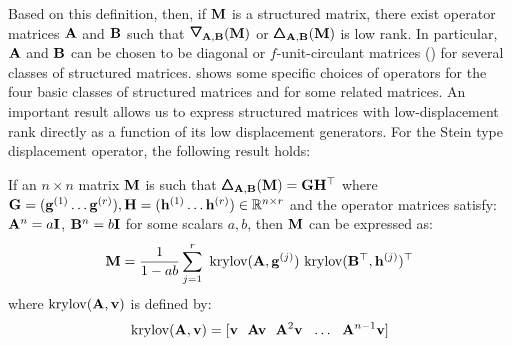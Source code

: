 \noindent
Based on this definition, then, if $\mathbf{M}$ is a structured matrix, there exist operator matrices $\mathbf{A}$ and $\mathbf{B}$ such that $\triangleopdown_{\Amat, \Bmat} (\Mmat)$ or $\pmb{\bigtriangleup}_{\mathbf{A}, \mathbf{B}} (\mathbf{M})$ is low rank.
In particular, $\mathbf{A}$ and $\mathbf{B}$ can be chosen to be diagonal or $f$-unit-circulant matrices (\eg {}) for several classes of structured matrices.
 shows some specific choices of operators for the four basic classes of structured matrices and for some related matrices.
An important result allows us to express structured matrices with low-displacement rank directly as a function of its low displacement generators.  
For the Stein type displacement operator, the following result holds:
\begin{theorem} \label{theorem:ch3-krylov_decomposition}
  If an $n \times n$ matrix $\mathbf{M}$ is such that $\pmb{\bigtriangleup}_{\mathbf{A}, \mathbf{B}}(\mathbf{M}) = \mathbf{G} \mathbf{H}^\top$ where 
  $\mathbf{G} = (\mathbf{g}^{(1)} \ldots \mathbf{g}^{(r)}), \mathbf{H} = (\mathbf{h}^{(1)} \ldots \mathbf{h}^{(r)}) \in \mathbb{R}^{n \times r}$ 
  and the operator matrices satisfy: $\mathbf{A}^n = a \mathbf{I}$, $\mathbf{B}^n = b \mathbf{I}$ for some scalars $a, b$, then $\mathbf{M}$ can be expressed as: 
  \begin{equation} \label{equation:ch3-krylov_decomposition}
    \mathbf{M} = \frac{1}{1 - ab} \sum_{j=1}^{r} ~\mathrm{krylov}(\mathbf{A}, \mathbf{g}^{(j)}) ~\mathrm{krylov}(\mathbf{B}^\top, \mathbf{h}^{(j)})^\top
  \end{equation}
  where $\mathrm{krylov}(\mathbf{A}, \mathbf{v})$ is defined by:
  \begin{equation}
    \mathrm{krylov}(\mathbf{A}, \mathbf{v}) = [\mathbf{v}~~\mathbf{A}\mathbf{v}~~\mathbf{A}^2 \mathbf{v}~~\ldots~~\mathbf{A}^{n-1} \mathbf{v}]
  \end{equation}
  \removespace
\end{theorem}

